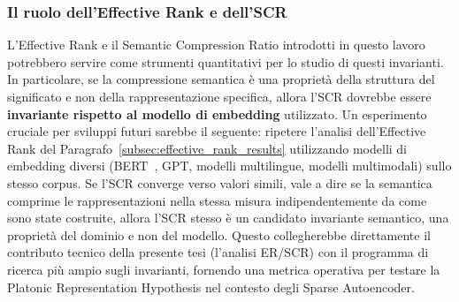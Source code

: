 \subsubsection{Il ruolo dell'Effective Rank e dell'SCR}
\label{subsubsec:ruolo_er_scr}
L'Effective Rank e il Semantic Compression Ratio introdotti in questo lavoro potrebbero servire come strumenti quantitativi per lo studio di questi invarianti. In particolare, se la compressione semantica è una proprietà della struttura del significato e non della rappresentazione specifica, allora l'SCR dovrebbe essere \textbf{invariante rispetto al modello di embedding} utilizzato.
Un esperimento cruciale per sviluppi futuri sarebbe il seguente: ripetere l'analisi dell'Effective Rank del Paragrafo~\ref{subsec:effective_rank_results} utilizzando modelli di embedding diversi (BERT~\parencite{devlin2018bert}, GPT, modelli multilingue, modelli multimodali) sullo stesso corpus. Se l'SCR converge verso valori simili, vale a dire se la semantica comprime le rappresentazioni nella stessa misura indipendentemente da come sono state costruite, allora l'SCR stesso è un candidato invariante semantico, una proprietà del dominio e non del modello.
Questo collegherebbe direttamente il contributo tecnico della presente tesi (l'analisi ER/SCR) con il programma di ricerca più ampio sugli invarianti, fornendo una metrica operativa per testare la Platonic Representation Hypothesis nel contesto degli Sparse Autoencoder.
